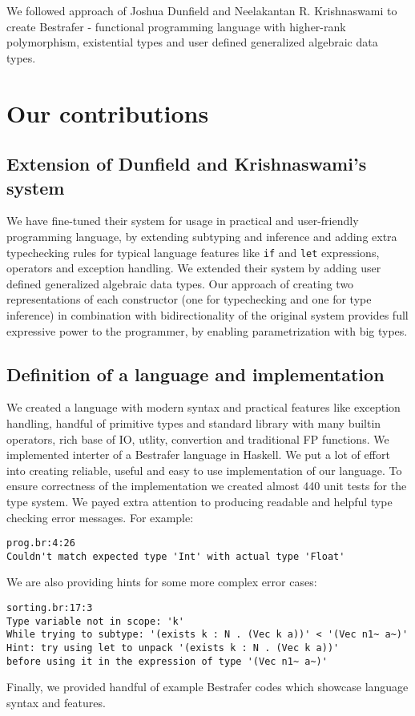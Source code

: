 \documentclass[declaration,shortabstract,english]{iithesis}
\begin{document}
We followed approach of Joshua Dunfield and Neelakantan R. Krishnaswami\cite{gadt-popl19} to create Bestrafer -
functional programming language with higher-rank polymorphism, existential types and user defined generalized algebraic data types.
\section{Our contributions}
\subsection*{Extension of Dunfield and Krishnaswami's system}
We have fine-tuned their system for usage in practical and user-friendly programming language, by
extending subtyping and inference and adding extra typechecking rules for typical language features like \verb+if+
and \verb+let+ expressions, operators and exception handling. We extended their system by adding user defined
generalized algebraic data types. Our approach of creating two representations of each constructor
(one for typechecking and one for type inference) in combination with bidirectionality of the original
system provides full expressive power to the programmer, by enabling parametrization with big types.
\subsection*{Definition of a language and implementation}
We created a language with modern syntax and practical features like exception handling, handful of primitive types
and standard library with many builtin operators, rich base of IO, utlity, convertion and traditional FP functions.
We implemented interter of a Bestrafer language in Haskell. We put a lot of effort into
creating reliable, useful and easy to use implementation of our language.
To ensure correctness of the implementation we created almost 440 unit tests for the type system.
We payed extra attention to producing readable and helpful type checking error messages.
For example:
\begin{verbatim}
prog.br:4:26
Couldn't match expected type 'Int' with actual type 'Float'
\end{verbatim}
We are also providing hints for some more complex error cases:
\begin{verbatim}
sorting.br:17:3
Type variable not in scope: 'k'
While trying to subtype: '(exists k : N . (Vec k a))' < '(Vec n1~ a~)'
Hint: try using let to unpack '(exists k : N . (Vec k a))'
before using it in the expression of type '(Vec n1~ a~)'
\end{verbatim}
Finally, we provided handful of example Bestrafer codes which showcase language syntax and features.
\end{document}
